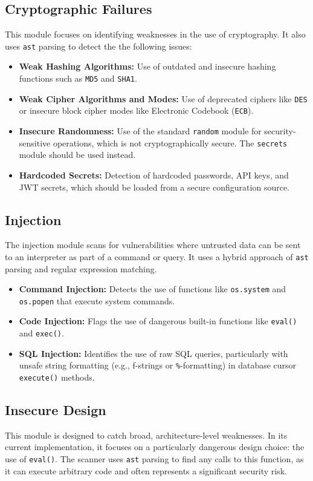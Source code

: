\subsection{Cryptographic Failures}
This module focuses on identifying weaknesses in the use of cryptography. It also uses \texttt{ast} parsing to detect the the following issues:
\begin{itemize}
    \item \textbf{Weak Hashing Algorithms:} Use of outdated and insecure hashing functions such as \texttt{MD5} and \texttt{SHA1}.
    \item \textbf{Weak Cipher Algorithms and Modes:} Use of deprecated ciphers like \texttt{DES} or insecure block cipher modes like Electronic Codebook (\texttt{ECB}).
    \item \textbf{Insecure Randomness:} Use of the standard \texttt{random} module for security-sensitive operations, which is not cryptographically secure. The \texttt{secrets} module should be used instead.
    \item \textbf{Hardcoded Secrets:} Detection of hardcoded passwords, API keys, and JWT secrets, which should be loaded from a secure configuration source.
\end{itemize}

\subsection{Injection}
The injection module scans for vulnerabilities where untrusted data can be sent to an interpreter as part of a command or query. It uses a hybrid approach of \texttt{ast} parsing and regular expression matching.
\begin{itemize}
    \item \textbf{Command Injection:} Detects the use of functions like \texttt{os.system} and \texttt{os.popen} that execute system commands.
    \item \textbf{Code Injection:} Flags the use of dangerous built-in functions like \texttt{eval()} and \texttt{exec()}.
    \item \textbf{SQL Injection:} Identifies the use of raw SQL queries, particularly with unsafe string formatting (e.g., f-strings or \texttt{\%}-formatting) in database cursor \texttt{execute()} methods.
\end{itemize}

\subsection{Insecure Design}
This module is designed to catch broad, architecture-level weaknesses. In its current implementation, it focuses on a particularly dangerous design choice: the use of \texttt{eval()}. The scanner uses \texttt{ast} parsing to find any calls to this function, as it can execute arbitrary code and often represents a significant security risk.


